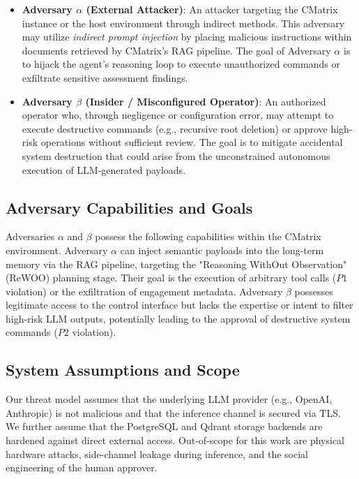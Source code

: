 \documentclass[conference,compsoc]{IEEEtran}
\begin{document}
\begin{itemize}
    \item \textbf{Adversary $\alpha$ (External Attacker)}: An attacker targeting the CMatrix instance or the host environment through indirect methods. This adversary may utilize \textit{indirect prompt injection} \cite{greshake} by placing malicious instructions within documents retrieved by CMatrix's RAG pipeline. The goal of Adversary $\alpha$ is to hijack the agent's reasoning loop to execute unauthorized commands or exfiltrate sensitive assessment findings.
    
    \item \textbf{Adversary $\beta$ (Insider / Misconfigured Operator)}: An authorized operator who, through negligence or configuration error, may attempt to execute destructive commands (e.g., recursive root deletion) or approve high-risk operations without sufficient review. The goal is to mitigate accidental system destruction that could arise from the unconstrained autonomous execution of LLM-generated payloads.
\end{itemize}

\subsection{Adversary Capabilities and Goals}
Adversaries $\alpha$ and $\beta$ possess the following capabilities within the CMatrix environment. Adversary $\alpha$ can inject semantic payloads into the long-term memory via the RAG pipeline, targeting the "Reasoning WithOut Observation" (ReWOO) planning stage. Their goal is the execution of arbitrary tool calls ($P1$ violation) or the exfiltration of engagement metadata. Adversary $\beta$ possesses legitimate access to the control interface but lacks the expertise or intent to filter high-risk LLM outputs, potentially leading to the approval of destructive system commands ($P2$ violation).

\subsection{System Assumptions and Scope}
Our threat model assumes that the underlying LLM provider (e.g., OpenAI, Anthropic) is not malicious and that the inference channel is secured via TLS. We further assume that the PostgreSQL and Qdrant storage backends are hardened against direct external access. Out-of-scope for this work are physical hardware attacks, side-channel leakage during inference, and the social engineering of the human approver.
\end{document}

